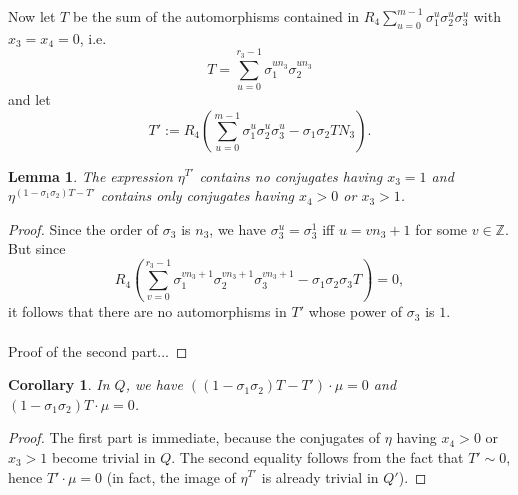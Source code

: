 \documentclass[12pt,a4paper]{article}
\newtheorem{lemma}[theorem]{Lemma}
\newtheorem{cor}[theorem]{Corollary}
\theoremstyle{definition}
\newcommand{\Z}{\mathbb{Z}}
\begin{document}
Now let $T$ be the sum of the automorphisms contained in  $R_4\sum_{u=0}^{m-1}\sigma_1^{u}\sigma_2^{u}\sigma_3^{u}$ with $x_3=x_4=0$, i.e. $$T=\sum_{u=0}^{r_3-1}\sigma_1^{un_3}\sigma_2^{un_3}$$
and let $$T':=R_4\left(\sum_{u=0}^{m-1}\sigma_1^{u}\sigma_2^{u}\sigma_3^{u}-\sigma_1\sigma_2 TN_3\right).$$
\begin{lemma}
The expression $\eta^{T'}$ contains no conjugates having $x_3=1$  and $\eta^{(1-\sigma_1\sigma_2)T-T'}$ contains only conjugates having $x_4>0$ or $x_3>1$. %
\end{lemma}
\begin{proof}
Since the order of $\sigma_3$ is $n_3$, we have $\sigma_3^u=\sigma_3^1$ iff $u=vn_3+1$ for some $v\in\Z$. But since $$R_4\left(\sum_{v=0}^{r_3-1}\sigma_1^{vn_3+1}\sigma_2^{vn_3+1}\sigma_3^{vn_3+1}-\sigma_1\sigma_2 \sigma_3T\right)=0,$$
it follows that there are no automorphisms in $T'$ whose power of $\sigma_3$ is $1$.
\paragraph*{}
Proof of the second part...
\end{proof}

\begin{cor}\label{Tdiag}
In $Q$, we have $((1-\sigma_1\sigma_2)T-T')\cdot \mu=0$ and $(1-\sigma_1\sigma_2)T\cdot \mu=0$.
\end{cor}
\begin{proof}
The first part is immediate, because the conjugates of $\eta$ having $x_4>0$ or $x_3>1$ become trivial in $Q$. The second equality follows from the fact that $T'\sim 0$, hence $T'\cdot \mu =0$ (in fact, the image of $\eta^{T'}$ is already trivial in $Q'$).
\end{proof}
\paragraph*{}
\end{document}
